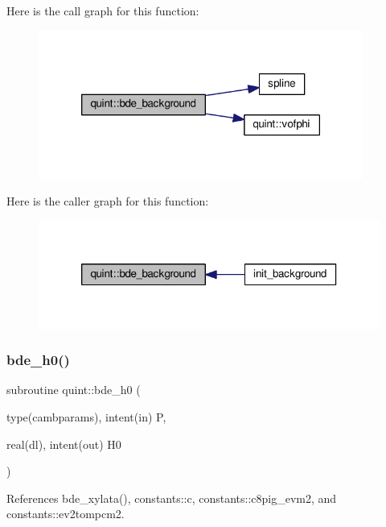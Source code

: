 Here is the call graph for this function\+:
\nopagebreak
\begin{figure}[H]
\begin{center}
\leavevmode
\includegraphics[width=302pt]{namespacequint_a6a96dda084f9c9c3188eaa2576b9bfe2_cgraph}
\end{center}
\end{figure}
Here is the caller graph for this function\+:
\nopagebreak
\begin{figure}[H]
\begin{center}
\leavevmode
\includegraphics[width=318pt]{namespacequint_a6a96dda084f9c9c3188eaa2576b9bfe2_icgraph}
\end{center}
\end{figure}
\mbox{\label{namespacequint_aa2daf9edc78c79ba058ae4833682c9a8}} 
\subsubsection{\texorpdfstring{bde\+\_\+h0()}{bde\_h0()}}
{\footnotesize\ttfamily subroutine quint\+::bde\+\_\+h0 (\begin{DoxyParamCaption}\item[{type(cambparams), intent(in)}]{P,  }\item[{real(dl), intent(out)}]{H0 }\end{DoxyParamCaption})}



References bde\+\_\+xylata(), constants\+::c, constants\+::c8pig\+\_\+evm2, and constants\+::ev2tompcm2.


